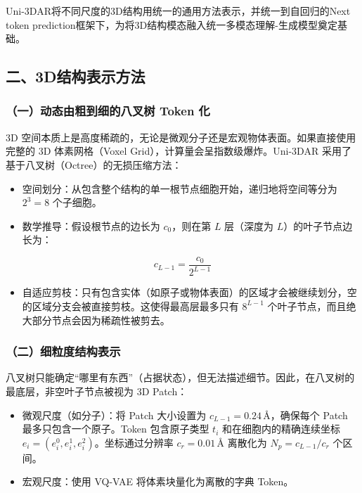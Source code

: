 Uni-3DAR将不同尺度的3D结构用统一的通用方法表示，并统一到自回归的Next token prediction框架下，为将3D结构模态融入统一多模态理解-生成模型奠定基础。

\hypertarget{ux4e8c3dux7ed3ux6784ux8868ux793aux65b9ux6cd5}{%
\subsection{二、3D结构表示方法}\label{ux4e8c3dux7ed3ux6784ux8868ux793aux65b9ux6cd5}}

\hypertarget{ux4e00ux52a8ux6001ux7531ux7c97ux5230ux7ec6ux7684ux516bux53c9ux6811-token-ux5316}{%
\subsubsection{（一）动态由粗到细的八叉树 Token 化}\label{ux4e00ux52a8ux6001ux7531ux7c97ux5230ux7ec6ux7684ux516bux53c9ux6811-token-ux5316}}

3D 空间本质上是高度稀疏的，无论是微观分子还是宏观物体表面。如果直接使用完整的 3D 体素网格（Voxel Grid），计算量会呈指数级爆炸。Uni-3DAR 采用了基于八叉树（Octree）的无损压缩方法：

\begin{itemize}
\tightlist
\item
  空间划分：从包含整个结构的单一根节点细胞开始，递归地将空间等分为 \(2^3 = 8\) 个子细胞。
\item
  数学推导：假设根节点的边长为 \(c_0\)，则在第 \(L\) 层（深度为 \(L\)）的叶子节点边长为：
\end{itemize}

\[
c_{L-1} = \frac{c_0}{2^{L-1}}
\]

\begin{itemize}
\tightlist
\item
  自适应剪枝：只有包含实体（如原子或物体表面）的区域才会被继续划分，空的区域分支会被直接剪枝。这使得最高层最多只有 \(8^{L-1}\) 个叶子节点，而且绝大部分节点会因为稀疏性被剪去。
\end{itemize}

\hypertarget{ux4e8cux7ec6ux7c92ux5ea6ux7ed3ux6784ux8868ux793a}{%
\subsubsection{（二）细粒度结构表示}\label{ux4e8cux7ec6ux7c92ux5ea6ux7ed3ux6784ux8868ux793a}}

八叉树只能确定``哪里有东西''（占据状态），但无法描述细节。因此，在八叉树的最底层，非空叶子节点被视为 3D Patch：

\begin{itemize}
\tightlist
\item
  微观尺度（如分子）：将 Patch 大小设置为 \(c_{L-1}=0.24\,\text{\AA}\)，确保每个 Patch 最多只包含一个原子。Token 包含原子类型 \(t_i\) 和在细胞内的精确连续坐标 \(e_i=(e_i^0,e_i^1,e_i^2)\)。坐标通过分辨率 \(c_r=0.01\,\text{\AA}\) 离散化为 \(N_p=c_{L-1}/c_r\) 个区间。
\item
  宏观尺度：使用 VQ-VAE 将体素块量化为离散的字典 Token。
\end{itemize}

